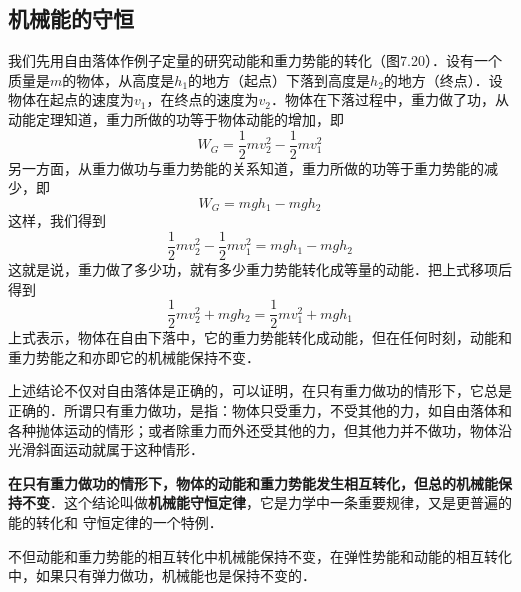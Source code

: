 \subsection{机械能的守恒} 
\begin{figure}[htp]\centering
{}
\caption{}
\end{figure}

我们先用自由落体作例子定量的研究动能和重力势能的转化（图7.20）．设有一个质量是$m$的物体，从高度是$h_1$的地方（起点）下落到高度是$h_2$的地方（终点）．设
物体在起点的速度为$v_1$，在终点的速度为$v_2$．物体在下落过程中，重力做了功，从动能定理知道，重力所做的功等于物体动能的增加，即
\[W_G=\frac{1}{2}mv_2^2-\frac{1}{2}mv^2_1 \]
另一方面，从重力做功与重力势能的关系知道，重力所做的功等于重力势能的减少，即
\[W_G=mgh_1-mgh_2\]
这样，我们得到
\[\frac{1}{2}mv_2^2-\frac{1}{2}mv^2_1 =mgh_1-mgh_2\]
这就是说，重力做了多少功，就有多少重力势能转化成等量的动能．把上式移项后得到
\[ \frac{1}{2}mv^2_2 +mgh_2=\frac{1}{2}mv^2_1 +mgh_1\]
上式表示，物体在自由下落中，它的重力势能转化成动能，但在任何时刻，动能和重力势能之和亦即它的机械能保持不变．

上述结论不仅对自由落体是正确的，可以证明，在只有重力做功的情形下，它总是正确的．所谓只有重力做功，是指：物体只受重力，不受其他的力，如自由落体和各种抛体运动的情形；或者除重力而外还受其他的力，但其他力并不做功，物体沿光滑斜面运动就属于这种情形．

\textbf{在只有重力做功的情形下，物体的动能和重力势能发生相互转化，但总的机械能保持不变}．这个结论叫做\textbf{机械能守恒定律}，它是力学中一条重要规律，又是更普遍的能的转化和
守恒定律的一个特例．

不但动能和重力势能的相互转化中机械能保持不变，在弹性势能和动能的相互转化中，如果只有弹力做功，机械能也是保持不变的．

